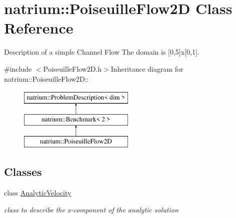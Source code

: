 \hypertarget{classnatrium_1_1PoiseuilleFlow2D}{
\section{natrium::PoiseuilleFlow2D Class Reference}
\label{classnatrium_1_1PoiseuilleFlow2D}
}


Description of a simple Channel Flow The domain is \mbox{[}0,5\mbox{]}x\mbox{[}0,1\mbox{]}.  


{\ttfamily \#include $<$PoiseuilleFlow2D.h$>$}Inheritance diagram for natrium::PoiseuilleFlow2D::\begin{figure}[H]
\begin{center}
\leavevmode
\includegraphics[height=3cm]{classnatrium_1_1PoiseuilleFlow2D}
\end{center}
\end{figure}
\subsection*{Classes}
\begin{DoxyCompactItemize}
\item 
class \hyperlink{classnatrium_1_1PoiseuilleFlow2D_1_1AnalyticVelocity}{AnalyticVelocity}
\begin{DoxyCompactList}\small\item\em class to describe the x-\/component of the analytic solution \item\end{DoxyCompactList}\end{DoxyCompactItemize}
